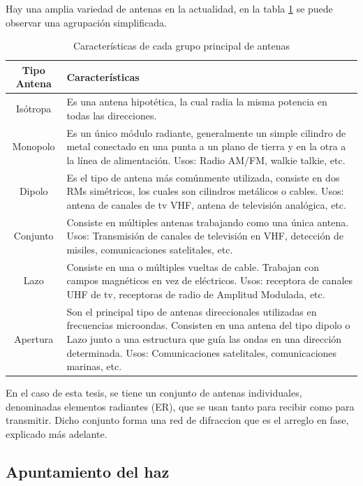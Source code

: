 Hay una amplia variedad de antenas en la actualidad, en la tabla \ref{tab:type_antennas} se puede observar una agrupación 
simplificada.

\begin{table}[H]
  \footnotesize
  \centering
  \begin{tabular}{|c|p{9cm}|}
	\hline
	\textbf{Tipo Antena} & \textbf{Características} \\\hline
	Isótropa & Es una antena hipotética, la cual radia la misma potencia en todas las direcciones.\\\hline
	Monopolo & Es un único módulo radiante, generalmente un simple cilindro de metal conectado en una punta a un plano de
	tierra y en la otra a la línea de alimentación. Usos: Radio AM/FM, walkie talkie, etc. \\\hline
	Dipolo & Es el tipo de antena más comúnmente utilizada, consiste en dos RMs simétricos, los cuales son cilindros
	metálicos o cables. Usos: antena de canales de tv VHF, antena de televisión analógica, etc. \\\hline
	Conjunto & Consiste en múltiples antenas trabajando como una única antena. Usos: Transmisión de canales de televisión en VHF,
	detección de misiles, comunicaciones satelitales, etc.\\\hline
	Lazo & Consiste en una o múltiples vueltas de cable. Trabajan con campos magnéticos en vez de eléctricos. Usos: receptora
	de canales UHF de tv, receptoras de radio de Amplitud Modulada, etc.\\\hline
	Apertura & Son el principal tipo de antenas direccionales utilizadas en frecuencias microondas. Consisten en una antena
	del tipo dipolo o Lazo junto a una estructura que guía las ondas en una dirección determinada. Usos: Comunicaciones
	satelitales, comunicaciones marinas, etc.\\\hline
  \end{tabular}
  \caption{Características de cada grupo principal de antenas}
  \label{tab:type_antennas}
\end{table}


En el caso de esta tesis, se tiene un conjunto de antenas individuales, denominadas elementos radiantes (ER), que se usan tanto
para recibir como para transmitir. Dicho conjunto forma una red de difraccion que es el arreglo en fase, explicado más adelante.


\subsection{Apuntamiento del haz} 

